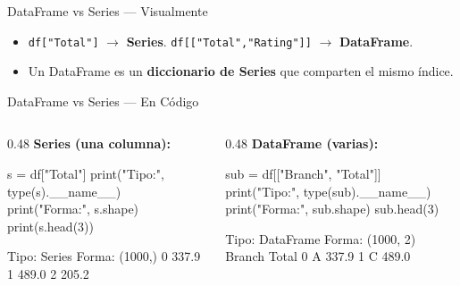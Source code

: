 \documentclass[aspectratio=169, 11pt]{beamer}
\begin{document}
\begin{frame}{DataFrame vs Series --- Visualmente}
  \vspace{10pt}
  {\scriptsize\color{textMuted}
  \begin{itemize}\setlength{\itemsep}{3pt}
    \item[{\color{arcaRed}\scriptsize\faArrowRight}]
      \texttt{df["Total"]} $\to$ \textbf{Series}. \quad
      \texttt{df[["Total","Rating"]]} $\to$ \textbf{DataFrame}.
    \item[{\color{arcaRed}\scriptsize\faLightbulb}]
      Un DataFrame es un \textbf{diccionario de Series} que comparten el mismo índice.
  \end{itemize}
  }
\end{frame}

\begin{frame}[fragile,shrink=28]{DataFrame vs Series --- En Código}
  \vspace{-6pt}
  \begin{columns}[T]
    \begin{column}{0.48\textwidth}
      {\scriptsize\color{codeBlue}\bfseries Series (una columna):}
      \begin{pyblock}[minted options={fontsize=\scriptsize, breaklines}]
s = df["Total"]
print("Tipo:", type(s).__name__)
print("Forma:", s.shape)
print(s.head(3))
      \end{pyblock}
      \vspace{-2pt}
      \begin{outputblock}[minted options={fontsize=\scriptsize, breaklines}]
Tipo: Series
Forma: (1000,)
0    337.9
1    489.0
2    205.2
      \end{outputblock}
    \end{column}

    \begin{column}{0.48\textwidth}
      {\scriptsize\color{arcaDark}\bfseries DataFrame (varias):}
      \begin{pyblock}[minted options={fontsize=\scriptsize, breaklines}]
sub = df[["Branch", "Total"]]
print("Tipo:", type(sub).__name__)
print("Forma:", sub.shape)
sub.head(3)
      \end{pyblock}
      \vspace{-2pt}
      \begin{outputblock}[minted options={fontsize=\scriptsize, breaklines}]
Tipo: DataFrame
Forma: (1000, 2)
  Branch  Total
0      A  337.9
1      C  489.0
      \end{outputblock}
    \end{column}
  \end{columns}
\end{frame}
\end{document}
